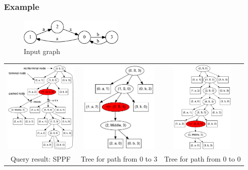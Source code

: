 \documentclass{beamer}
\begin{document}
\begin{frame}
  \transwipe[direction=90]
  \frametitle{Example}
\begin{figure}[ht]
    \centering
        \includegraphics[width=0.45\textwidth]{pictures/input.pdf}
        \caption{Input graph}
\end{figure}

\begin{tabular}{  c  c  c  }
      \includegraphics[height=4.5cm]{pictures/AnBn.pdf}
    &
      \includegraphics[height=4.5cm]{pictures/AnBn_2.pdf}
    &
      \includegraphics[height=4.5cm]{pictures/AnBn_1.pdf}

\\
\small{Query result: SPPF}
& \small{Tree for path from 0 to 3}
& \small{Tree for path from 0 to 0}
  \end{tabular}
\end{frame}
\end{document}
